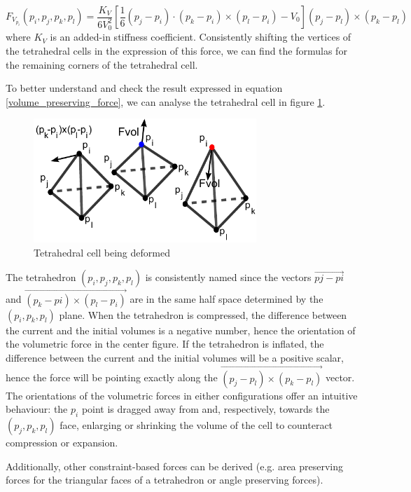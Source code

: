 \documentclass[12pt]{article}
\begin{document}
\begin{equation}
\label{volume_preserving_force}
F_{V_{p_i}}(p_i, p_j, p_k, p_l) = \frac{K_V}{6V_0^2}\left[\frac{1}{6}(p_j - p_i) \cdot (p_k - p_i) \times (p_l - p_i) - V_0\right] (p_j - p_l) \times (p_k - p_l)
\end{equation}
where $K_V$ is an added-in stiffness coefficient. Consistently shifting the vertices of the tetrahedral cells in the expression of this force, we can find the formulas for the remaining corners of the tetrahedral cell.

To better understand and check the result expressed in equation \ref{volume_preserving_force}, we can analyse the tetrahedral cell in figure \ref{fig_volumetric_force}.

\begin{figure}[h!]
\label{fig_volumetric_force}
\caption{Tetrahedral cell being deformed }
\centering
\includegraphics[width=0.75\textwidth]{"figs/volumetric_force"}
\end{figure}
The tetrahedron $(p_i, p_j, p_k, p_l)$ is consistently named since the vectors $\overrightarrow{pj - pi}$ and $\overrightarrow{(p_k - pi) \times (p_l - p_i)}$ are in the same half space determined by the $(p_i, p_k, p_l)$ plane. When the tetrahedron is compressed, the difference between the current and the initial volumes is a negative number, hence the orientation of the volumetric force in the center figure. If the tetrahedron is inflated, the difference between the current and the initial volumes will be a positive scalar, hence the force will be pointing exactly along the $\overrightarrow{(p_j-p_l) \times (p_k-p_l)}$ vector. The orientations of the volumetric forces in either configurations offer an intuitive behaviour: the $p_i$ point is dragged away from and, respectively, towards the $(p_j,p_k,p_l)$ face, enlarging or shrinking the volume of the cell to counteract compression or expansion.


Additionally, other constraint-based forces can be derived (e.g. area preserving forces for the triangular faces of a tetrahedron or angle preserving forces).
\end{document}
